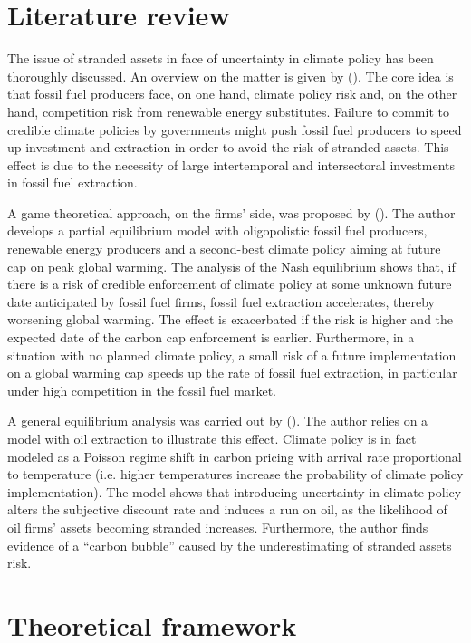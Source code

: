 \documentclass[american]{scrartcl}
\newcommand{\citein}[1]{\citeauthor{#1} (\citeyear{#1})}
\begin{document}
\section{Literature review}

The issue of stranded assets in face of uncertainty in climate policy has been thoroughly discussed. An overview on the matter is given by \citein{Ploeg2020}. The core idea is that fossil fuel producers face, on one hand, climate policy risk and, on the other hand, competition risk from renewable energy substitutes. Failure to commit to credible climate policies by governments might push fossil fuel producers to speed up investment and extraction in order to avoid the risk of stranded assets. This effect is due to the necessity of large intertemporal and intersectoral investments in fossil fuel extraction.

A game theoretical approach, on the firms' side, was proposed by \citein{Ploeg2020b}. The author develops a partial equilibrium model with oligopolistic fossil fuel producers, renewable energy producers and a second-best climate policy aiming at future cap on peak global warming. The analysis of the Nash equilibrium shows that, if there is a risk of credible enforcement of climate policy at some unknown future date anticipated by fossil fuel firms, fossil fuel extraction accelerates, thereby worsening global warming. The effect is exacerbated if the risk is higher and the expected date of the carbon cap enforcement is earlier. Furthermore, in a situation with no planned climate policy, a small risk of a future implementation on a global warming cap speeds up the rate of fossil fuel extraction, in particular under high competition in the fossil fuel market.

A general equilibrium analysis was carried out by \citein{Barnett2019}. The author relies on a model with oil extraction to illustrate this effect. Climate policy is in fact modeled as a Poisson regime shift in carbon pricing with arrival rate proportional to temperature (i.e. higher temperatures increase the probability of climate policy implementation). The model shows that introducing uncertainty in climate policy alters the subjective discount rate and induces a run on oil, as the likelihood of oil firms' assets becoming stranded increases. Furthermore, the author finds evidence of a ``carbon bubble'' caused by the underestimating of stranded assets risk.

\section{Theoretical framework}
\end{document}
